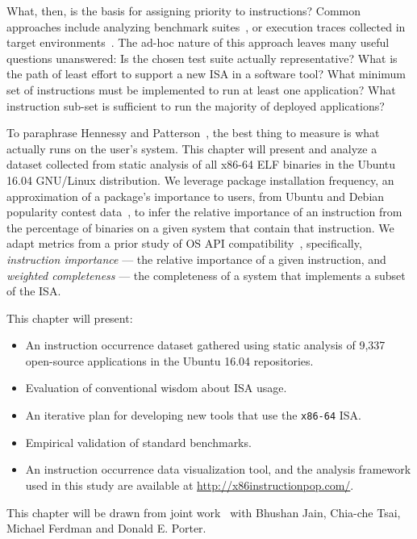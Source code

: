 What, then, is the basis for assigning priority to instructions? Common
approaches include analyzing benchmark suites~\cite{SPEC2017-ab,Henning2006-ns,
bienia11benchmarking}, or execution traces collected in target
environments~\cite{elastictraces-axa}.
The ad-hoc nature of this approach leaves many useful questions unanswered:
Is the chosen test suite actually representative?
What is the path of least effort to support a new ISA in a software tool?
What minimum set of instructions must be implemented to run at least one
application? What instruction sub-set is sufficient to run the majority of
deployed applications?

To paraphrase Hennessy and Patterson~\cite{Patterson-textbook}, the best thing
to measure is what actually runs on the user's system.
This chapter will present and analyze a dataset collected from static analysis
of all x86-64 ELF binaries in the Ubuntu 16.04 GNU/Linux distribution.
We leverage package installation frequency, an approximation of a package's
importance to users, from Ubuntu and Debian popularity contest
data~\cite{ubuntu-popcon-tj,debian-popcorn-sb}, to infer the relative
importance of an instruction from the percentage of binaries on a given
system that contain that instruction.
We adapt metrics from a prior study of OS API compatibility~\cite{Tsai2016-zq},
specifically, \textit{instruction importance} --- the relative importance of
a given instruction, and \textit{weighted completeness} --- the completeness
of a system that implements a subset of the ISA.

\noindent This chapter will present:
\begin{itemize}[noitemsep, topsep=0pt, leftmargin=1em, labelwidth=*, align=left]
\item An instruction occurrence dataset gathered using static analysis of
	9,337 open-source applications in the Ubuntu 16.04 repositories.
\item Evaluation of conventional wisdom about ISA usage.
\item An iterative plan for developing new tools that use the
	\texttt{x86-64} ISA.
\item Empirical validation of standard benchmarks.
\item An instruction occurrence data visualization tool, and the analysis framework used in this study are available at
	\url{http://x86instructionpop.com/}.
\end{itemize}

This chapter will be drawn from joint work~\cite{x86-systor} with Bhushan
Jain, Chia-che Tsai, Michael Ferdman and Donald E. Porter.